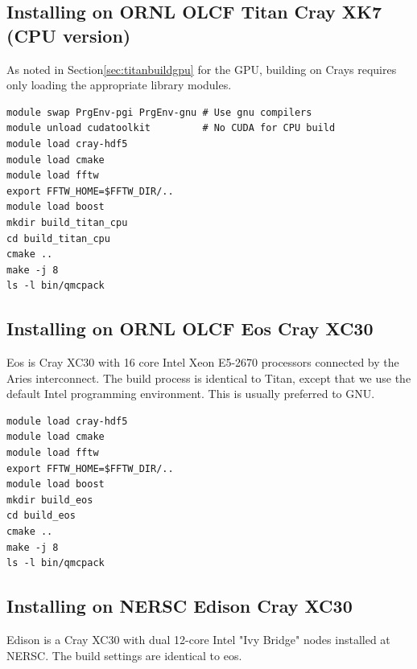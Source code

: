 \subsection{Installing on ORNL OLCF Titan Cray XK7 (CPU version)}
As noted in Section\ref{sec:titanbuildgpu} for the GPU, building on
Crays requires only loading the appropriate library modules.

\begin{verbatim}
module swap PrgEnv-pgi PrgEnv-gnu # Use gnu compilers
module unload cudatoolkit         # No CUDA for CPU build
module load cray-hdf5
module load cmake
module load fftw
export FFTW_HOME=$FFTW_DIR/..
module load boost
mkdir build_titan_cpu
cd build_titan_cpu
cmake ..
make -j 8  
ls -l bin/qmcpack 
\end{verbatim}

\subsection{Installing on ORNL OLCF Eos Cray XC30}
Eos is Cray XC30 with 16 core Intel Xeon E5-2670 processors connected
by the Aries interconnect. The build process is identical to Titan,
except that we use the default Intel programming environment. This is
usually preferred to GNU.
\begin{verbatim}
module load cray-hdf5
module load cmake
module load fftw
export FFTW_HOME=$FFTW_DIR/..
module load boost
mkdir build_eos
cd build_eos
cmake ..
make -j 8 
ls -l bin/qmcpack 
\end{verbatim}

\subsection{Installing on NERSC Edison Cray XC30}

Edison is a Cray XC30 with dual 12-core Intel "Ivy Bridge" nodes 
installed at NERSC. The build settings are identical to eos. 

